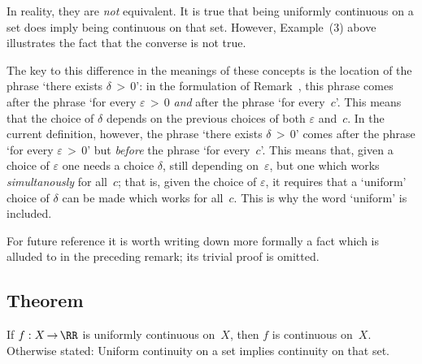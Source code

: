         In reality, they are {\em not} equivalent. It is true that being uniformly continuous on a set does imply being continuous on that set.
    However, Example~(3) above illustrates the fact that the converse is not true.

        The key to this difference in the meanings of these concepts is the location of the phrase `there exists ${\delta}\,>\,0$':
    in the formulation of Remark~, this phrase comes after the phrase
    `for every ${\varepsilon}\,>\,0$ {\em and} after the phrase `for every~$c$'. This means that the choice of ${\delta}$ depends on
    the previous choices of both ${\varepsilon}$ and~$c$. In the current definition, however,
    the phrase `there exists ${\delta}\,>\,0$' comes after the phrase `for every ${\varepsilon}\,>\,0$' but {\em before} the phrase `for every~$c$'.
    This means that, given a choice of ${\varepsilon}$ one needs a choice ${\delta}$,
    still depending on~${\varepsilon}$, but one which works {\em simultanously} for all~$c$; that is,
    given the choice of ${\varepsilon}$, it requires that a `uniform' choice of ${\delta}$ can be made which works for all~$c$.
    This is why the word `uniform' is included.

\VV

        For future reference it is worth writing down more formally a fact which is alluded to in the preceding remark; its trivial proof is omitted.

\V


            \subsection{\small{\bf Theorem}}
            \label{ThmD25.65C}

\V

        If $f:X \,{\rightarrow}\, {\RR}$ is uniformly continuous on~$X$, then $f$ is continuous on~$X$.
    Otherwise stated: Uniform continuity on a set implies continuity on that set.

\VV

